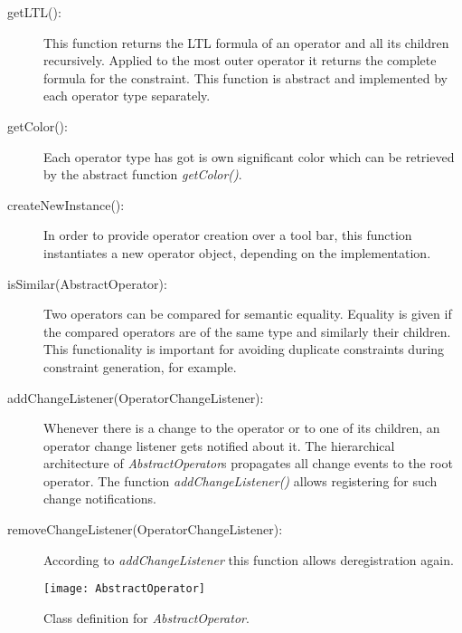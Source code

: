 \begin{description}
	\item[getLTL():] This function returns the LTL formula of an operator and all its children recursively. Applied to the most outer operator it returns the complete formula for the constraint. This function is abstract and implemented by each operator type separately.
	\item[getColor():] Each operator type has got is own significant color which can be retrieved by the abstract function \emph{getColor()}.
	\item[createNewInstance():] In order to provide operator creation over a tool bar, this function instantiates a new operator object, depending on the implementation.
	\item[isSimilar(AbstractOperator):] Two operators can be compared for semantic equality. Equality is given if the compared operators are of the same type and similarly their children. This functionality is important for avoiding duplicate constraints during constraint generation, for example.
	\item[addChangeListener(OperatorChangeListener):] Whenever there is a change to the operator or to one of its children, an operator change listener gets notified about it. The hierarchical architecture of \emph{AbstractOperator}s propagates all change events to the root operator. The function \emph{addChangeListener()} allows registering for such change notifications.
	\item[removeChangeListener(OperatorChangeListener):] According to \emph{addChangeListener} this function allows deregistration again.
\end{description}

\begin{figure}[htbp]
  \centering
  \texttt{[image: AbstractOperator]} 
  \caption{Class definition for \emph{AbstractOperator}.}
  \label{fig:abstractoperator}
\end{figure}

